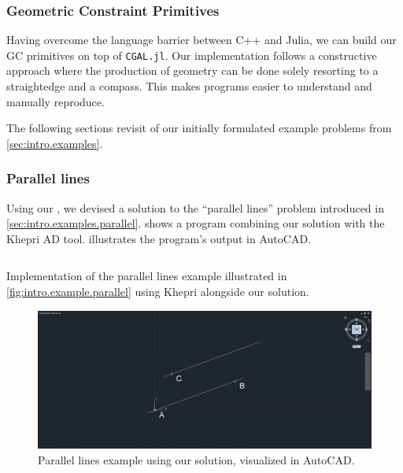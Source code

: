 \subsubsection{Geometric Constraint Primitives}%
\label{sec:solution.impl.gcps}

Having overcome the language barrier between C++ and Julia, we can build our
\ac{GC} primitives on top of \texttt{CGAL.jl}.  Our implementation follows a
constructive approach where the production of geometry can be done solely
resorting to a straightedge and a compass.  This makes programs easier to
understand and manually reproduce.

The following sections revisit of our initially formulated example problems from
\cref{sec:intro.examples}.

\subsubsection*{Parallel lines}%
\label{sec:solution.impl.gcps.parallel}

Using our \primitives{}, we devised a solution to the ``parallel lines'' problem
introduced in \cref{sec:intro.examples.parallel}.
 shows a program combining our solution
with the Khepri \ac{AD} tool.  illustrates
the program's output in AutoCAD\@.

\begin{listing}[htbp]
  \inputminted{julia}{jl/ex_parallel.jl}
  \caption{\label{lst:solution.impl.gcps.parallel}
    Implementation of the parallel lines example illustrated in
    \cref{fig:intro.example.parallel} using Khepri alongside our solution.}
\end{listing}

\begin{figure}[htbp]
  \includegraphics[width=\linewidth]{fig/autocad-parallel} 
  \caption{\label{fig:solution.impl.gcps.parallel}
    Parallel lines example using our solution, visualized in AutoCAD\@.}
\end{figure}

